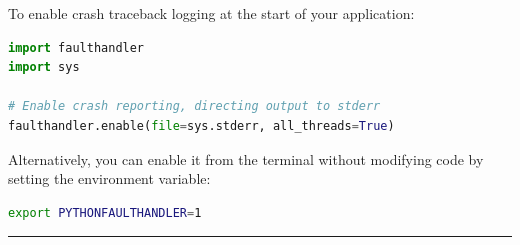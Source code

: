 To enable crash traceback logging at the start of your application:

\begin{lstlisting}[language=Python]
import faulthandler
import sys

# Enable crash reporting, directing output to stderr
faulthandler.enable(file=sys.stderr, all_threads=True)
\end{lstlisting}

Alternatively, you can enable it from the terminal without modifying
code by setting the environment variable:

\begin{lstlisting}[language=bash]
export PYTHONFAULTHANDLER=1
\end{lstlisting}

\begin{center}\rule{0.5\linewidth}{0.5pt}\end{center}
